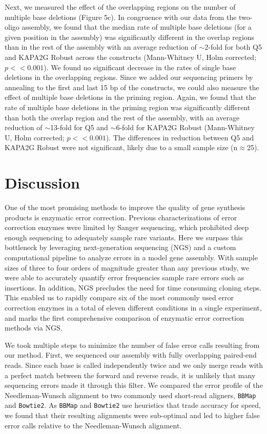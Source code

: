 \documentclass[twocolumn]{article}
\begin{document}
Next, we measured the effect of the overlapping regions on the number of multiple base deletions (Figure 5c). In congruence with our data from the two-oligo assembly, we found that the median rate of multiple base deletions (for a given position in the assembly) was significantly different in the overlap regions than in the rest of the assembly with an average reduction of $\sim$2-fold for both Q5 and KAPA2G Robust across the constructs (Mann-Whitney U, Holm corrected; $p<<0.001$).  We found no significant decrease in the rates of single base deletions in the overlapping regions. Since we added our sequencing primers by annealing to the first and last 15 bp of the constructs, we could also measure the effect of multiple base deletions in the priming region. Again, we found that the rate of multiple base deletions in the priming region was significantly different than both the overlap region and the rest of the assembly, with an average reduction of $\sim$13-fold for Q5 and $\sim$6-fold for KAPA2G Robust (Mann-Whitney U, Holm corrected; $p<<0.001$). The differences in reduction between Q5 and KAPA2G Robust were not significant, likely due to a small sample size (n$\approx$25).

%
\section*{Discussion}
%
One of the most promising methods to improve the quality of gene synthesis products is enzymatic error correction. Previous characterizations of error correction enzymes were limited by Sanger sequencing, which prohibited deep enough sequencing to adequately sample rare variants. Here we surpass this bottleneck by leveraging next-generation sequencing (NGS) and a custom computational pipeline to analyze errors in a model gene assembly. With sample sizes of three to four orders of magnitude greater than any previous study, we were able to accurately quantify error frequencies sample rare errors such as insertions. In addition, NGS precludes the need for time consuming cloning steps. This enabled us to rapidly compare six of the most commonly used error correction enzymes in a total of eleven different conditions in a single experiment, and marks the first comprehensive comparison of enzymatic error correction methods via NGS.

We took multiple steps to minimize the number of false error calls resulting from our method. First, we sequenced our assembly with fully overlapping paired-end reads. Since each base is called independently twice and we only merge reads with a perfect match between the forward and reverse reads, it is unlikely that many sequencing errors made it through this filter. We compared the error profile of the Needleman-Wunsch alignment to two commonly used short-read aligners, \texttt{BBMap} and \texttt{Bowtie2}. As \texttt{BBMap} and \texttt{Bowtie2} use heuristics that trade accuracy for speed, we found that their resulting alignments were sub-optimal and led to higher false error calls relative to the Needleman-Wunsch alignment.
\end{document}
